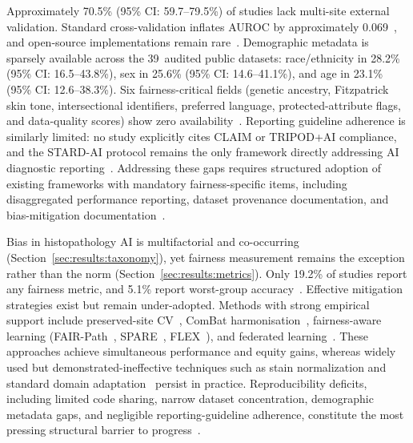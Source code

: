 Approximately 70.5\% (95\% CI: 59.7--79.5\%) of studies lack multi-site external validation. Standard
cross-validation inflates AUROC by approximately 0.069~\citep{howard2021site}, and
open-source implementations remain rare~\citep{koh2021wilds,
weng2024grandqc}. Demographic metadata is sparsely available across the 39~audited public datasets: race/ethnicity in 28.2\% (95\% CI: 16.5--43.8\%), sex in 25.6\% (95\% CI: 14.6--41.1\%), and age in 23.1\% (95\% CI: 12.6--38.3\%). Six fairness-critical fields (genetic ancestry, Fitzpatrick skin tone, intersectional identifiers, preferred language, protected-attribute flags, and data-quality scores) show zero availability~\citep{norori2021addressing, montezuma2025unbiased}. Reporting guideline adherence is similarly limited: no
study explicitly cites CLAIM or TRIPOD+AI compliance, and the STARD-AI
protocol remains the only framework directly addressing AI
diagnostic reporting~\citep{sounderajah2021stardai}. Addressing these gaps requires structured
adoption of existing frameworks with mandatory fairness-specific items,
including disaggregated performance reporting, dataset provenance documentation, and bias-mitigation
documentation~\citep{chen2023algorithmic, yang2024survey,
chinta2025aidriven}.

\label{sec:results:summary}%
Bias in histopathology AI is multifactorial and co-occurring
(Section~\ref{sec:results:taxonomy}), yet fairness measurement remains
the exception rather than the norm
(Section~\ref{sec:results:metrics}). Only 19.2\% of studies report any
fairness metric, and 5.1\% report worst-group
accuracy~\citep{soltan2024challenges, xu2026spare}. Effective mitigation strategies exist but remain under-adopted. Methods with strong empirical
support include preserved-site CV~\citep{howard2021site}, ComBat
harmonisation~\citep{murchan2024combat}, fairness-aware learning
(FAIR-Path~\citep{lin2025contrastive}, SPARE~\citep{xu2026spare},
FLEX~\citep{huang2025knowledge}), and federated
learning~\citep{hosseini2023proportionally, zhang2025dynamicfl}. These approaches achieve
simultaneous performance and equity gains, whereas widely used but
demonstrated-ineffective techniques such as stain normalization and standard
domain adaptation~\citep{voon2023evaluating, koh2021wilds} persist in practice.
Reproducibility deficits, including limited code sharing, narrow dataset
concentration, demographic metadata gaps, and negligible
reporting-guideline adherence, constitute the most pressing structural
barrier to progress~\citep{norori2021addressing, sounderajah2021stardai,
chinta2025aidriven}.

